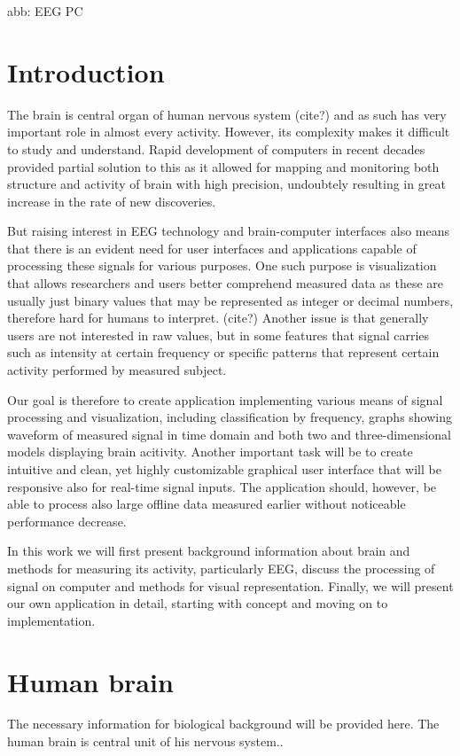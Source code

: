 abb:
EEG
PC

\chapter{Introduction}
The brain is central organ of human nervous system (cite?) and as such has very
important role in almost every activity. However, its complexity makes it
difficult to study and understand. Rapid development of computers in recent
decades provided partial solution to this as it allowed for mapping and
monitoring both structure and activity of brain with high precision,
undoubtely resulting in great increase in the rate of new discoveries.

But raising interest in EEG technology and brain-computer interfaces also means
that there is an evident need for user interfaces and applications capable of
processing these signals for various purposes. One such purpose is visualization
that allows researchers and users better comprehend measured data as these are
usually just binary values that may be represented as integer or decimal
numbers, therefore hard for humans to interpret. (cite?) Another issue is that
generally users are not interested in raw values, but in some features that
signal carries such as intensity at certain frequency or specific patterns that
represent certain activity performed by measured subject.

Our goal is therefore to create application implementing various means of signal
processing and visualization, including classification by frequency, graphs
showing waveform of measured signal in time domain and both two and
three-dimensional models displaying brain acitivity. Another important task will
be to create intuitive and clean, yet highly customizable graphical user
interface that will be responsive also for real-time signal inputs. The
application should, however, be able to process also large offline data measured
earlier without noticeable performance decrease.

In this work we will first present background information about brain and
methods for measuring its activity, particularly EEG, discuss the processing of
signal on computer and methods for visual representation. Finally, we will
present our own application in detail, starting with concept and moving on to
implementation.
 
\chapter{Human brain}
The necessary information for biological background will be
provided here. The human brain is central unit of his nervous system..
